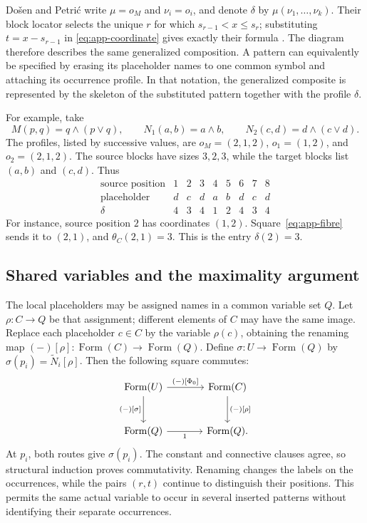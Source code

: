 \documentclass[11pt]{article}
\newcommand{\FormulaSet}{\operatorname{Form}}
\begin{document}
Do\v{s}en and Petri\'c write $\mu=o_M$ and $\nu_i=o_i$, and denote
$\delta$ by $\mu(\nu_1,\ldots,\nu_k)$. Their block locator selects the
unique $r$ for which $s_{r-1}<x\leq s_r$; substituting
$t=x-s_{r-1}$ in \eqref{eq:app-coordinate} gives exactly their
formula \cite[\S2.5, p.~46]{DP}. The diagram therefore describes the
same generalized composition. A pattern can equivalently be
specified by erasing its placeholder names to one common symbol and
attaching its occurrence profile. In that notation, the generalized
composite is represented by the skeleton of the substituted pattern
together with the profile $\delta$.

For example, take
\[
 M(p,q)=q\wedge(p\vee q),\qquad
 N_1(a,b)=a\wedge b,\qquad
 N_2(c,d)=d\wedge(c\vee d).
\]
The profiles, listed by successive values, are
$o_M=(2,1,2)$, $o_1=(1,2)$, and $o_2=(2,1,2)$.
The source blocks have sizes $3,2,3$, while the target blocks list
$(a,b)$ and $(c,d)$. Thus
\[
\begin{array}{c|ccc|cc|ccc}
 \text{source position}&1&2&3&4&5&6&7&8\\\hline
 \text{placeholder}&d&c&d&a&b&d&c&d\\
 \delta&4&3&4&1&2&4&3&4
\end{array}
\]
For instance, source position $2$ has coordinates $(1,2)$.
Square~\eqref{eq:app-fibre} sends it to $(2,1)$, and
$\theta_C(2,1)=3$. This is the entry $\delta(2)=3$.

\subsection{Shared variables and the maximality argument}\label{app:shared}

The local placeholders may be assigned names in a common variable
set $Q$. Let $\rho:C\to Q$ be that assignment; different elements
of $C$ may have the same image. Replace each placeholder $c\in C$
by the variable $\rho(c)$, obtaining the renaming map
$(-)[\rho]:\FormulaSet(C)\to\FormulaSet(Q)$. Define
$\sigma:U\to\FormulaSet(Q)$ by
$\sigma(p_i)=\widetilde N_i[\rho]$.
Then the following square commutes:
\begin{equation}\label{eq:app-renaming}
\begin{tikzcd}[column sep=large,row sep=large]
 \FormulaSet(U)\arrow[r,"{(-)[\Phi_0]}"]
    \arrow[d,"{(-)[\sigma]}"']
   &\FormulaSet(C)\arrow[d,"{(-)[\rho]}"]\\
 \FormulaSet(Q)\arrow[r,"1"']&\FormulaSet(Q).
\end{tikzcd}
\end{equation}
At $p_i$, both routes give $\sigma(p_i)$. The constant and connective
clauses agree, so structural induction proves commutativity.
Renaming changes the labels on the occurrences, while the pairs
$(r,t)$ continue to distinguish their positions. This permits the
same actual variable to occur in several inserted patterns without
identifying their separate occurrences.
\end{document}
